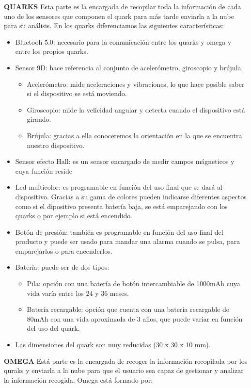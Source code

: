 \textbf{QUARKS}
Esta parte es la encargada de recopilar toda la información de cada uno de los sensores que componen el quark para más tarde enviarla a la nube para su análisis. En los quarks diferenciamos las siguientes caracterísitcas:
\begin{itemize}
\item Bluetooh 5.0: necesario para la comunicación entre los quarks y omega y entre los propios quarks.
\item Sensor 9D: hace referencia al conjunto de acelerómetro, giroscopio y brújula.
\begin{itemize}
\item Acelerómetro: mide aceleraciones y vibraciones, lo que hace posible saber si el dispositivo se está moviendo.
\item Giroscopio: mide la velicidad angular y detecta cuando el dispositivo está girando. 
\item Brújula: gracias a ella conoceremos la orientación en la que se encuentra nuestro dispositivo.
\end{itemize}
\item Sensor efecto Hall: es un sensor encargado de medir campos mágneticos y cuya función reside
\item Led multicolor: es programable en función del uso final que se dará al dispositivo. Gracias a su gama de colores pueden indicarse diferentes aspectos como si el dipositivo presenta batería baja, se está emparejando con los quarks o por ejemplo si está encendido.
\item Botón de presión: también es programable en función del uso final del producto y puede ser usado para mandar una alarma cuando se pulsa, para emparejarlos o para encenderlos.
\item Batería: puede ser de dos tipos:
\begin{itemize}
\item Pila: opción con una batería de botón intercambiable de 1000mAh cuya vida varía entre los 24 y 36 meses.
\item Batería recargable: opción que cuenta con una batería recargable de 80mAh con una vida aproximada de 3 años, que puede variar en función del uso del quark. 
\end{itemize}
\item Las dimensiones del quark son muy reducidas (30 x 30 x 10 mm).
\end{itemize}

\textbf{OMEGA}
Está parte es la encargada de recoger la información recopilada por los quraks y enviarla a la nube para que el usuario sea capaz de gestionar y analizar la información recogida. Omega está formado por:

